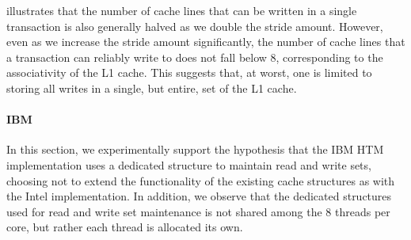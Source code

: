  illustrates that the number of cache
lines that can be written in a single transaction 
is also generally halved as we
double the stride amount.  However, even as we increase the stride amount
significantly, the number of cache lines that a 
transaction can reliably write
to does not fall below 8, corresponding to the associativity 
of the L1 cache.  This suggests that, at worst, one is limited 
to storing all writes in a single, but entire, set of the L1 cache.

\paragraph{IBM}

In this section, we experimentally support the hypothesis
that the IBM HTM implementation uses a dedicated structure
to maintain read and write sets, choosing not to extend the 
functionality of the existing cache structures as with
the Intel implementation.  In addition, we observe
that the dedicated structures used for read and write set
maintenance is not shared among the 8 threads per core, but rather
each thread is allocated its own.

